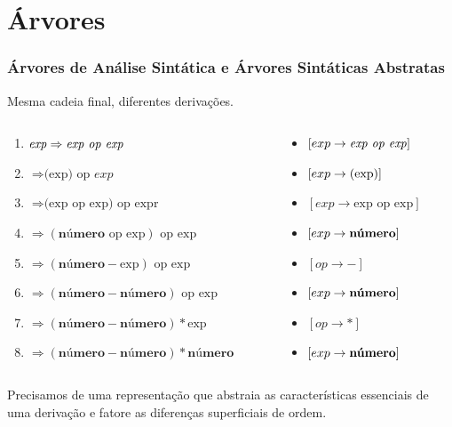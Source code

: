 \documentclass[table]{beamer}
\begin{document}
\section{Árvores}
\begin{frame}
   \frametitle{Árvores de Análise Sintática e Árvores Sintáticas Abstratas}
   Mesma cadeia final, diferentes derivações.
   \footnotesize
   \begin{columns}
   \begin{column}{0.6\textwidth}
      \begin{enumerate}
         \item $\text{\textit{exp}} \Rightarrow \textit{exp op exp}$
	 \item \hspace{0.55cm} $\Rightarrow \text{(exp) op } \textit{exp}$
	 \item \hspace{0.55cm} $\Rightarrow \text{(exp op exp)} \text{ op expr}$
	 \item \hspace{0.55cm} $\Rightarrow (\textbf{número} \text{ op exp})\text{ op exp}$
	 \item \hspace{0.55cm} $\Rightarrow (\textbf{número} - \text{exp})\text{ op exp}$
	 \item \hspace{0.55cm} $\Rightarrow (\textbf{número} - \textbf{número})\text{ op exp}$
	 \item \hspace{0.55cm} $\Rightarrow (\textbf{número} - \textbf{número}) * \text{exp}$
	 \item \hspace{0.55cm} $\Rightarrow (\textbf{número} - \textbf{número}) * \textbf{número}$
      \end{enumerate}
   \end{column}
   \begin{column}{0.4\textwidth}
      \begin{itemize}
          \item[] $[exp \to \text{\textit{exp op exp}}]$
          \item[] $[exp \to \text{\text{(exp)}}]$
          \item[] $[exp \to \text{exp op exp}]$ 
          \item[] $[exp \to \text{\textbf{número}}]$
          \item[] $[op  \to -]$ 
          \item[] $[exp \to \text{\textbf{número}}]$ 
          \item[] $[op  \to *]$ 
          \item[] $[exp \to \text{\textbf{número}}]$ 
      \end{itemize}
   \end{column}
   \end{columns}
   \normalsize
   \vspace{1.0cm}
   Precisamos de uma representação que abstraia as características essenciais de uma derivação e fatore as diferenças superficiais de ordem.
\end{frame}
\end{document}
